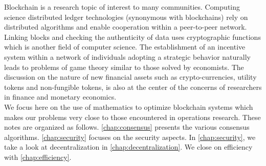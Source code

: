 \noindent Blockchain is a research topic of interest to many communities. Computing science distributed ledger technologies (synonymous with blockchains) rely on distributed algorithms and enable cooperation within a peer-to-peer network. Linking blocks and checking the authenticity of data uses cryptographic functions which is another field of computer science. The establishment of an incentive system within a network of individuals adopting a strategic behavior naturally leads to problems of game theory similar to those solved by economists. The discussion on the nature of new financial assets such as crypto-currencies, utility tokens and non-fungible tokens, is also at the center of the concerns of researchers in finance and monetary economics. \\

\noindent We focus here on the use of mathematics to optimize blockchain systems which makes our problems very close to those encountered in operations research. These notes are organized as follows. \cref{chap:consensus} presents the various consensus algorithms. \cref{chap:security} focuses on the security aspects. In \cref{chap:security}, we take a look at decentralization in \cref{chap:decentralization}. We close on efficiency with \cref{chap:efficiency}.

\newpage